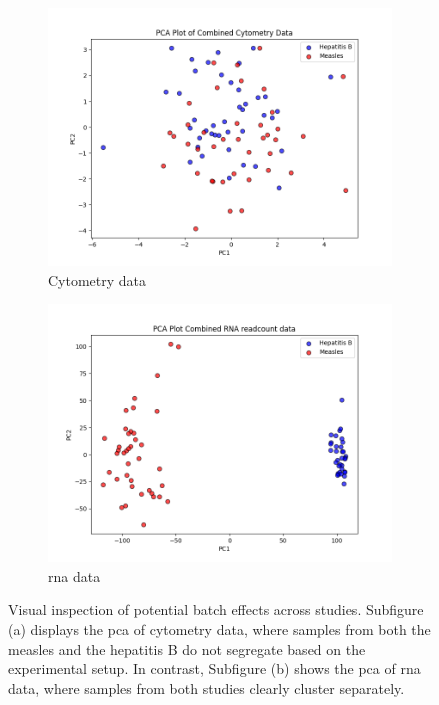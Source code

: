 \documentclass[12pt,a4paper]{report}
\begin{document}
\begin{figure}[H] 
    \centering 

    \begin{subfigure}[b]{0.49\textwidth}
        \centering
        \includegraphics[width=\textwidth]{images/M&H_PCA_Ctyometry.png} 
        \caption{Cytometry data} 
        \label{fig:m&h_pca_cytometry}
    \end{subfigure}
    \hfill
    \begin{subfigure}[b]{0.49\textwidth}
        \centering
        \includegraphics[width=\linewidth]{images/M&H_PCA_RNA.png}
        \caption{\acrshort{rna} data} 
        \label{fig:m&h_pca_rna} 
    \end{subfigure}

    \caption[\gls{pca} of Multimodal Data from measles and hepatitis B Studies]{Visual inspection of potential batch effects across studies. Subfigure (a) displays the \gls{pca} of cytometry data, where samples from both the measles and the hepatitis B do not segregate based on the experimental setup. In contrast, Subfigure (b) shows the \gls{pca} of \acrshort{rna} data, where samples from both studies clearly cluster separately.} 
    \label{fig:m&h_pca_both} 
\end{figure}
\end{document}

